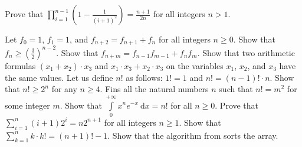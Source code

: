 \begin{chapterendexercises}
        Prove that
        $\prod_{i = 1}^{n - 1} \left(1 - \frac{1}{(i + 1)^2} \right) =
        \frac{n + 1}{2n}$ for all integers $n > 1$.

    \exercise Let $f_0 = 1$, $f_1 = 1$, and $f_{n + 2} = f_{n + 1} + f_n$ for
        all integers $n \ge 0$. Show that
        $f_n \ge \left(\frac{3}{2}\right)^{n - 2}$.
    \exercise Show that $f_{n + m} = f_{n - 1} f_{m - 1} + f_n f_m$.
    \exercise Show that two arithmetic formulas $(x_1 + x_2) \cdot x_3$ and
        $x_1 \cdot x_3 + x_2 \cdot x_3$ on the variables $x_1$, $x_2$, and $x_3$
        have the same values.
    \exercise Let us define $n!$ as follows: $1! = 1$ and
      $n! = (n - 1)! \cdot n$. Show that $n! \ge 2^n$ for any $n \ge 4$.
    \exercise[open] Fins all the natural numbers $n$ such that $n! = m^2$ for
      some integer $m$.
    \exercise Show that
        $\int\limits_0^{+\infty} x^n e^{- x} ~ \mathrm{d}x = n!$
        for all $n \ge 0$.
    \exercise Prove that $\sum_{i = 1}^n (i + 1) 2^i = n 2^{n + 1}$
        for all integers $n \ge 1$.
    \exercise Show that $\sum_{k = 1}^n k \cdot k! = (n + 1)! - 1$.
    \exercise Show that the algorithm from 
      sorts the array.
\end{chapterendexercises}
